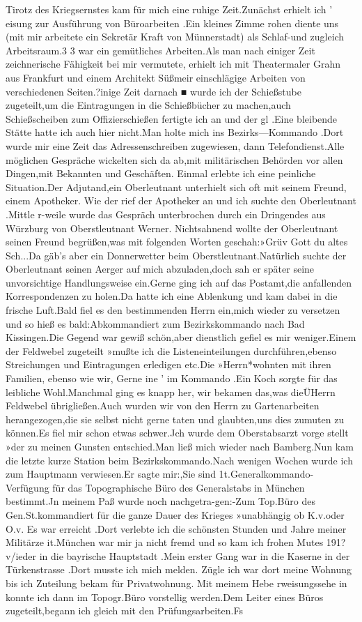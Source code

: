\documentclass[a4paper,11pt]{article}
\begin{document}
Tirotz des Kriegsernstes kam für mich eine ruhige Zeit.Zunächst erhielt ich ’ eisung zur Ausführung von Büroarbeiten .Ein kleines Zimme rohen diente uns (mit mir arbeitete ein Sekretär Kraft von Münnerstadt) als Schlaf-und zugleich Arbeitsraum.3 3 war ein gemütliches Arbeiten.Als man nach einiger Zeit zeichnerische Fähigkeit bei mir vermutete, erhielt ich mit Theatermaler Grahn aus Frankfurt und einem Architekt Süßmeir einschlägige Arbeiten von verschiedenen Seiten.?inige Zeit darnach ■ wurde ich der Schießstube zugeteilt,um die Eintragungen in die Schießbücher zu machen,auch Schießscheiben zum Offizierschießen fertigte ich an und der gl .Eine bleibende Stätte hatte ich auch hier nicht.Man holte mich ins Bezirks—Kommando .Dort wurde mir eine Zeit das Adressenschreiben zugewiesen, dann Telefondienst.Alle möglichen Gespräche wickelten sich da ab,mit militärischen Behörden vor allen Dingen,mit Bekannten und Geschäften. Einmal erlebte ich eine peinliche Situation.Der Adjutand,ein Oberleutnant unterhielt sich oft mit seinem Freund, einem Apotheker. Wie der rief der Apotheker an und ich suchte den Oberleutnant .Mittle r-weile wurde das Gespräch unterbrochen durch ein Dringendes aus Würzburg von Oberstleutnant Werner. Nichtsahnend wollte der Oberleutnant seinen Freund begrüßen,was mit folgenden Worten geschah:»Grüv Gott du altes Sch...Da gäb’s aber ein Donnerwetter beim Oberstleutnant.Natürlich suchte der Oberleutnant seinen Aerger auf mich abzuladen,doch sah er später seine unvorsichtige Handlungsweise ein.Gerne ging ich auf das Postamt,die anfallenden Korrespondenzen zu holen.Da hatte ich eine Ablenkung und kam dabei in die frische Luft.Bald fiel es den bestimmenden Herrn ein,mich wieder zu versetzen und so hieß es bald:Abkommandiert zum Bezirkskommando nach Bad Kissingen.Die Gegend war gewiß schön,aber dienstlich gefiel es mir weniger.Einem der Feldwebel zugeteilt »mußte ich die Listeneinteilungen durchführen,ebenso Streichungen und Eintragungen erledigen etc.Die »Herrn*wohnten mit ihren Familien, ebenso wie wir, Gerne ine ’ im Kommando .Ein Koch sorgte für das leibliche Wohl.Manchmal ging es knapp her, wir bekamen das,was dieÜHerrn Feldwebel übrigließen.Auch wurden wir von den Herrn zu Gartenarbeiten herangezogen,die sie selbst nicht gerne taten und glaubten,uns dies zumuten zu können.Es fiel mir schon etwas schwer.Jch wurde dem Oberstabsarzt vorge stellt »der zu meinen Gunsten entschied.Man ließ mich wieder nach Bamberg.Nun kam die letzte kurze Station beim Bezirkskommando.Nach wenigen Wochen wurde ich zum Hauptmann verwiesen.Er sagte mir:,Sie sind 1t.Generalkommando-Verfügung für das Topographische Büro des Generalstabs in München bestimmt.Jn meinem Paß wurde noch nachgetra-gen:-Zum Top.Büro des Gen.St.kommandiert für die ganze Dauer des Krieges »unabhängig ob K.v.oder O.v. Es war erreicht .Dort verlebte ich die schönsten Stunden und Jahre meiner Militärze it.München war mir ja nicht fremd und so kam ich frohen Mutes 191? v/ieder in die bayrische Hauptstadt .Mein erster Gang war in die Kaserne in der Türkenstrasse .Dort musste ich mich melden. Zügle ich war dort meine Wohnung bis ich Zuteilung bekam für Privatwohnung. Mit meinem Hebe rweisungssehe in konnte ich dann im Topogr.Büro vorstellig werden.Dem Leiter eines Büros zugeteilt,begann ich gleich mit den Prüfungsarbeiten.Fs 
\end{document}
